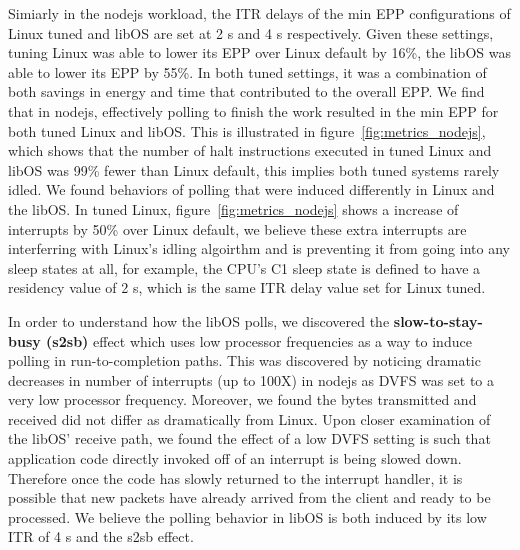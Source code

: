 

Simiarly in the nodejs workload, the ITR delays of the min EPP configurations of Linux tuned and libOS are set at 2 \micro s and 4 \micro s respectively. Given these settings, tuning Linux was able to lower its EPP over Linux default by 16\%, the libOS was able to lower its EPP by 55\%. In both tuned settings, it was a combination of both savings in energy and time that contributed to the overall EPP. We find that in nodejs, effectively polling to finish the work resulted in the min EPP for both tuned Linux and libOS. This is illustrated in figure~\ref{fig:metrics_nodejs}, which shows that the number of halt instructions executed in tuned Linux and libOS was 99\% fewer than Linux default, this implies both tuned systems rarely idled. We found behaviors of polling that were induced differently in Linux and the libOS. In tuned Linux, figure~\ref{fig:metrics_nodejs} shows a increase of interrupts by 50\% over Linux default, we believe these extra interrupts are interferring with Linux's idling algoirthm and is preventing it from going into any sleep states at all, for example, the CPU's C1 sleep state is defined to have a residency value of 2 \micro s, which is the same ITR delay value set for Linux tuned.


In order to understand how the libOS polls, we discovered the \textbf{slow-to-stay-busy (s2sb)} effect which uses low processor frequencies as a way to induce polling in run-to-completion paths. This was discovered by noticing dramatic decreases in number of interrupts (up to 100X) in nodejs as DVFS was set to a very low processor frequency. Moreover, we found the bytes transmitted and received did not differ as dramatically from Linux. Upon closer examination of the libOS' receive path, we found the effect of a low DVFS setting is such that application code directly invoked off of an interrupt is being slowed down. Therefore once the code has slowly returned to the interrupt handler, it is possible that new packets have already arrived from the client and ready to be processed. We believe the polling behavior in libOS is both induced by its low ITR of 4 \micro s and the s2sb effect.



